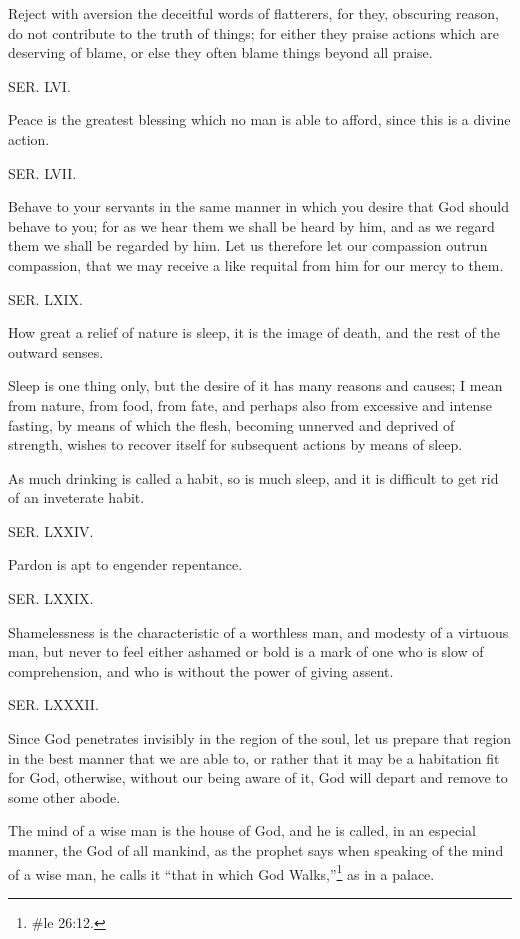Reject with aversion the deceitful words of flatterers, for they, obscuring reason, do not contribute
to the truth of things; for either they praise actions which are deserving of blame, or else they often
blame things beyond all praise.

SER. LVI.

Peace is the greatest blessing which no man is able to afford, since this is a divine action.

SER. LVII.

Behave to your servants in the same manner in which you desire that God should behave to you;
for as we hear them we shall be heard by him, and as we regard them we shall be regarded by him.
Let us therefore let our compassion outrun compassion, that we may receive a like requital from
him for our mercy to them.

SER. LXIX.

How great a relief of nature is sleep, it is the image of death, and the rest of the outward senses.

Sleep is one thing only, but the desire of it has many reasons and causes; I mean from nature,
from food, from fate, and perhaps also from excessive and intense fasting, by means of which the
flesh, becoming unnerved and deprived of strength, wishes to recover itself for subsequent actions
by means of sleep.

As much drinking is called a habit, so is much sleep, and it is difficult to get rid of an inveterate
habit.

SER. LXXIV.

Pardon is apt to engender repentance.

SER. LXXIX.

Shamelessness is the characteristic of a worthless man, and modesty of a virtuous man, but never
to feel either ashamed or bold is a mark of one who is slow of comprehension, and who is without
the power of giving assent.

SER. LXXXII.

Since God penetrates invisibly in the region of the soul, let us prepare that region in the best
manner that we are able to, or rather that it may be a habitation fit for God, otherwise, without our
being aware of it, God will depart and remove to some other abode.

The mind of a wise man is the house of God, and he is called, in an especial manner, the God of all
mankind, as the prophet says when speaking of the mind of a wise man, he calls it ``that in which
God Walks,''\footnote{\#le 26:12.} as in a palace.

